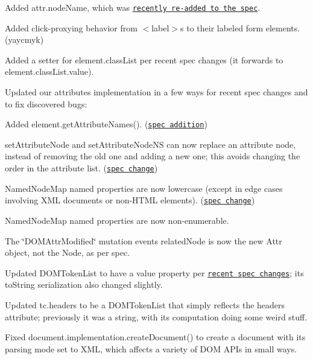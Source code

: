 \begin{DoxyItemize}
\item Added {\ttfamily attr.\+node\+Name}, which was \href{https://github.com/whatwg/dom/issues/171}{\tt recently re-\/added to the spec}.
\item Added click-\/proxying behavior from {\ttfamily $<$label$>$}s to their labeled form elements. (yaycmyk)
\item Added a setter for {\ttfamily element.\+class\+List} per recent spec changes (it forwards to {\ttfamily element.\+class\+List.\+value}).
\item Updated our attributes implementation in a few ways for recent spec changes and to fix discovered bugs\+:
\begin{DoxyItemize}
\item Added {\ttfamily element.\+get\+Attribute\+Names()}. (\href{https://github.com/whatwg/dom/issues/115}{\tt spec addition})
\item {\ttfamily set\+Attribute\+Node} and {\ttfamily set\+Attribute\+Node\+NS} can now replace an attribute node, instead of removing the old one and adding a new one; this avoids changing the order in the attribute list. (\href{https://github.com/whatwg/dom/issues/116}{\tt spec change})
\item {\ttfamily Named\+Node\+Map} named properties are now lowercase (except in edge cases involving X\+ML documents or non-\/\+H\+T\+ML elements). (\href{https://github.com/whatwg/dom/issues/141}{\tt spec change})
\item {\ttfamily Named\+Node\+Map} named properties are now non-\/enumerable.
\item The {\ttfamily \char`\"{}\+D\+O\+M\+Attr\+Modified\char`\"{}} mutation event\textquotesingle{}s {\ttfamily related\+Node} is now the new {\ttfamily Attr} object, not the {\ttfamily Node}, as per spec.
\end{DoxyItemize}
\item Updated {\ttfamily D\+O\+M\+Token\+List} to have a {\ttfamily value} property per \href{https://github.com/whatwg/dom/issues/119}{\tt recent spec changes}; its {\ttfamily to\+String} serialization also changed slightly.
\item Updated {\ttfamily tc.\+headers} to be a {\ttfamily D\+O\+M\+Token\+List} that simply reflects the {\ttfamily headers} attribute; previously it was a string, with its computation doing some weird stuff.
\item Fixed {\ttfamily document.\+implementation.\+create\+Document()} to create a document with its parsing mode set to X\+ML, which affects a variety of D\+OM A\+P\+Is in small ways.

\end{DoxyItemize}
